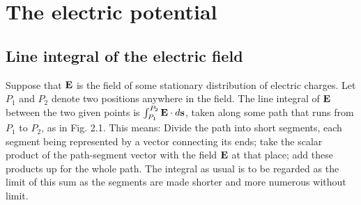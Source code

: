 \chapter{The electric potential}

\section{Line integral of the electric field}
Suppose that $\mathbf{E}$ is the field of some stationary distribution of electric
charges. Let $P_1$ and $P_2$ denote two positions anywhere in the
field. The line integral of $\mathbf{E}$ between the two given points is 
$\int_{P_1}^{P_2}\mathbf{E}\cdot d\mathbf{s}$,
taken along some path that runs from $P_1$ to $P_2$, as in Fig. 2.1. This
means: Divide the path into short segments, each segment being
represented by a vector connecting its ends; take the scalar product
of the path-segment vector with the field $\mathbf{E}$ at that place; add these
products up for the whole path. The integral as usual is to be 
regarded as the limit of this sum as the segments are made shorter and
more numerous without limit.

